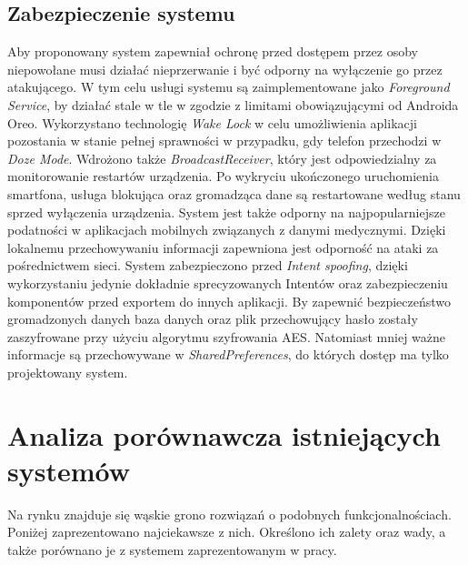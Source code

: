 \subsection{Zabezpieczenie systemu}
Aby proponowany system zapewniał ochronę przed dostępem przez osoby niepowołane musi działać nieprzerwanie i być odporny na wyłączenie go przez atakującego. W tym celu usługi systemu są zaimplementowane jako \textit{Foreground Service}, by
działać stale w tle w zgodzie z limitami obowiązującymi od Androida Oreo\cite{BGLimitsOreo}. Wykorzystano technologię \textit{Wake Lock}\cite{WakeLock} w celu umożliwienia aplikacji pozostania w stanie pełnej sprawności
w przypadku, gdy telefon przechodzi w \textit{Doze Mode}\cite{DozeMode}. Wdrożono także \textit{BroadcastReceiver}, który jest
odpowiedzialny za monitorowanie restartów urządzenia. Po wykryciu ukończonego uruchomienia smartfona, usługa blokująca oraz gromadząca dane
są restartowane według stanu sprzed wyłączenia urządzenia.
\newline\newline
\indent System jest także odporny na najpopularniejsze podatności w aplikacjach mobilnych związanych z danymi medycznymi\cite{Security-Mobile-Health-Apps}. Dzięki lokalnemu przechowywaniu informacji zapewniona jest odporność na ataki za pośrednictwem sieci. System zabezpieczono przed \textit{Intent spoofing}, dzięki wykorzystaniu jedynie dokładnie sprecyzowanych Intentów oraz zabezpieczeniu komponentów przed exportem do innych aplikacji. By zapewnić bezpieczeństwo gromadzonych danych baza danych oraz plik przechowujący hasło zostały zaszyfrowane przy użyciu algorytmu szyfrowania AES. Natomiast mniej ważne informacje są przechowywane w \textit{SharedPreferences}, do których dostęp ma tylko projektowany system.
\section{Analiza porównawcza istniejących systemów}
Na rynku znajduje się wąskie grono rozwiązań o podobnych funkcjonalnościach. Poniżej zaprezentowano najciekawsze z nich. Określono ich zalety oraz
wady, a także porównano je z systemem zaprezentowanym w pracy.
